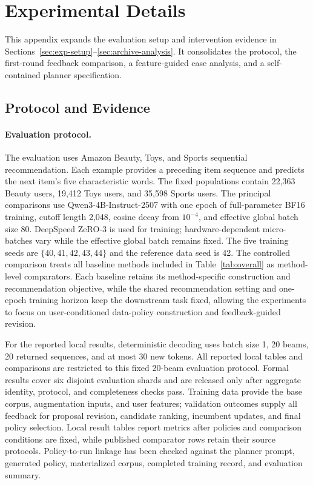 \section{Experimental Details}
\label{app:experiments}

This appendix expands the evaluation setup and intervention evidence in Sections~\ref{sec:exp-setup}--\ref{sec:archive-analysis}. It consolidates the protocol, the first-round feedback comparison, a feature-guided case analysis, and a self-contained planner specification.

\subsection{Protocol and Evidence}

\paragraph{Evaluation protocol.}
The evaluation uses Amazon Beauty, Toys, and Sports sequential recommendation. Each example provides a preceding item sequence and predicts the next item's five characteristic words. The fixed populations contain 22,363 Beauty users, 19,412 Toys users, and 35,598 Sports users. The principal comparisons use Qwen3-4B-Instruct-2507 with one epoch of full-parameter BF16 training, cutoff length 2,048, cosine decay from $10^{-4}$, and effective global batch size 80. DeepSpeed ZeRO-3 is used for training; hardware-dependent micro-batches vary while the effective global batch remains fixed. The five training seeds are $\{40,41,42,43,44\}$ and the reference data seed is 42.
The controlled comparison treats all baseline methods included in Table~\ref{tab:overall} as method-level comparators. Each baseline retains its method-specific construction and recommendation objective, while the shared recommendation setting and one-epoch training horizon keep the downstream task fixed, allowing the experiments to focus on user-conditioned data-policy construction and feedback-guided revision.

For the reported local results, deterministic decoding uses batch size 1, 20 beams, 20 returned sequences, and at most 30 new tokens. All reported local tables and comparisons are restricted to this fixed 20-beam evaluation protocol. Formal results cover six disjoint evaluation shards and are released only after aggregate identity, protocol, and completeness checks pass. Training data provide the base corpus, augmentation inputs, and user features; validation outcomes supply all feedback for proposal revision, candidate ranking, incumbent updates, and final policy selection. Local result tables report metrics after policies and comparison conditions are fixed, while published comparator rows retain their source protocols. Policy-to-run linkage has been checked against the planner prompt, generated policy, materialized corpus, completed training record, and evaluation summary.

